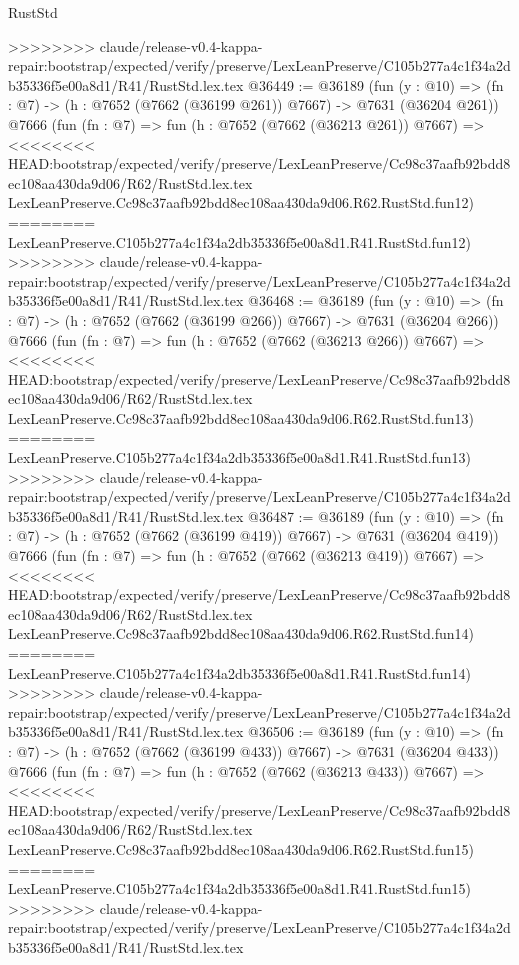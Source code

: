 \begin{lexlean}{RustStd}
\begin{coremodule}
{\begin{coremodule}
{{{{{{{{{{{{{{{{{{{{{{{{{{{{{{{{{{{{{{{{{{{{{{{{{{{{{>>>>>>>> claude/release-v0.4-kappa-repair:bootstrap/expected/verify/preserve/LexLeanPreserve/C105b277a4c1f34a2db35336f5e00a8d1/R41/RustStd.lex.tex
@36449 := @36189
    (fun (y : @10) => (fn : @7) -> (h : @7652 (@7662 (@36199 @261)) @7667) -> @7631 (@36204 @261))
    @7666
    (fun (fn : @7) =>
    fun (h : @7652 (@7662 (@36213 @261)) @7667) =>
<<<<<<<< HEAD:bootstrap/expected/verify/preserve/LexLeanPreserve/Cc98c37aafb92bdd8ec108aa430da9d06/R62/RustStd.lex.tex
    LexLeanPreserve.Cc98c37aafb92bdd8ec108aa430da9d06.R62.RustStd.fun12)
========
    LexLeanPreserve.C105b277a4c1f34a2db35336f5e00a8d1.R41.RustStd.fun12)
>>>>>>>> claude/release-v0.4-kappa-repair:bootstrap/expected/verify/preserve/LexLeanPreserve/C105b277a4c1f34a2db35336f5e00a8d1/R41/RustStd.lex.tex
@36468 := @36189
    (fun (y : @10) => (fn : @7) -> (h : @7652 (@7662 (@36199 @266)) @7667) -> @7631 (@36204 @266))
    @7666
    (fun (fn : @7) =>
    fun (h : @7652 (@7662 (@36213 @266)) @7667) =>
<<<<<<<< HEAD:bootstrap/expected/verify/preserve/LexLeanPreserve/Cc98c37aafb92bdd8ec108aa430da9d06/R62/RustStd.lex.tex
    LexLeanPreserve.Cc98c37aafb92bdd8ec108aa430da9d06.R62.RustStd.fun13)
========
    LexLeanPreserve.C105b277a4c1f34a2db35336f5e00a8d1.R41.RustStd.fun13)
>>>>>>>> claude/release-v0.4-kappa-repair:bootstrap/expected/verify/preserve/LexLeanPreserve/C105b277a4c1f34a2db35336f5e00a8d1/R41/RustStd.lex.tex
@36487 := @36189
    (fun (y : @10) => (fn : @7) -> (h : @7652 (@7662 (@36199 @419)) @7667) -> @7631 (@36204 @419))
    @7666
    (fun (fn : @7) =>
    fun (h : @7652 (@7662 (@36213 @419)) @7667) =>
<<<<<<<< HEAD:bootstrap/expected/verify/preserve/LexLeanPreserve/Cc98c37aafb92bdd8ec108aa430da9d06/R62/RustStd.lex.tex
    LexLeanPreserve.Cc98c37aafb92bdd8ec108aa430da9d06.R62.RustStd.fun14)
========
    LexLeanPreserve.C105b277a4c1f34a2db35336f5e00a8d1.R41.RustStd.fun14)
>>>>>>>> claude/release-v0.4-kappa-repair:bootstrap/expected/verify/preserve/LexLeanPreserve/C105b277a4c1f34a2db35336f5e00a8d1/R41/RustStd.lex.tex
@36506 := @36189
    (fun (y : @10) => (fn : @7) -> (h : @7652 (@7662 (@36199 @433)) @7667) -> @7631 (@36204 @433))
    @7666
    (fun (fn : @7) =>
    fun (h : @7652 (@7662 (@36213 @433)) @7667) =>
<<<<<<<< HEAD:bootstrap/expected/verify/preserve/LexLeanPreserve/Cc98c37aafb92bdd8ec108aa430da9d06/R62/RustStd.lex.tex
    LexLeanPreserve.Cc98c37aafb92bdd8ec108aa430da9d06.R62.RustStd.fun15)
========
    LexLeanPreserve.C105b277a4c1f34a2db35336f5e00a8d1.R41.RustStd.fun15)
>>>>>>>> claude/release-v0.4-kappa-repair:bootstrap/expected/verify/preserve/LexLeanPreserve/C105b277a4c1f34a2db35336f5e00a8d1/R41/RustStd.lex.tex
}}}}}}}}}}}}}}}}}}}}}}}}}}}}}}}}}}}}}}}}}}}}}}}}}}}}}
\end{coremodule}}
\end{coremodule}
\end{lexlean}
